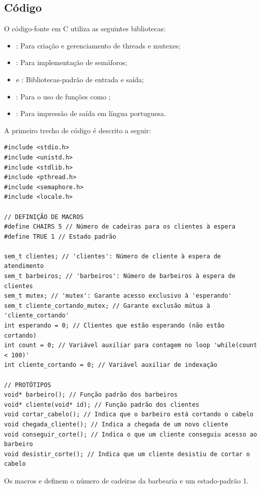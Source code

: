 \documentclass[
	12pt,				%
	openright,			%
	oneside,			%
	a4paper,			%
	chapter=TITLE,		%
	english,			%
	french,				%
	spanish,			%
	brazil				%
	]{abntex2}
\theoremstyle{definition}
\begin{document}
\subsection{Código}
O código-fonte em C utiliza as seguintes bibliotecas:
\begin{itemize}
    \item \textbf{}: Para criação e gerenciamento de threads e mutexes;
    \item \textbf{}: Para implementação de semáforos;
    \item \textbf{} e \textbf{}: Bibliotecas-padrão de entrada e saída;
    \item \textbf{}: Para o uso de funções como ;
    \item \textbf{}: Para impressão de saída em língua portuguesa.
\end{itemize}

A primeiro trecho de código é descrito a seguir:
\begin{verbatim}
#include <stdio.h>
#include <unistd.h>
#include <stdlib.h>
#include <pthread.h>
#include <semaphore.h>
#include <locale.h>

// DEFINIÇÃO DE MACROS
#define CHAIRS 5 // Número de cadeiras para os clientes à espera
#define TRUE 1 // Estado padrão

sem_t clientes; // 'clientes': Número de cliente à espera de atendimento 
sem_t barbeiros; // 'barbeiros': Número de barbeiros à espera de clientes 
sem_t mutex; // 'mutex': Garante acesso exclusivo à 'esperando'
sem_t cliente_cortando_mutex; // Garante exclusão mútua à 'cliente_cortando'
int esperando = 0; // Clientes que estão esperando (não estão cortando) 
int count = 0; // Variável auxiliar para contagem no loop 'while(count < 100)'
int cliente_cortando = 0; // Variável auxiliar de indexação

// PROTÓTIPOS
void* barbeiro(); // Função padrão dos barbeiros
void* cliente(void* id); // Função padrão dos clientes
void cortar_cabelo(); // Indica que o barbeiro está cortando o cabelo
void chegada_cliente(); // Indica a chegada de um novo cliente
void conseguir_corte(); // Indica o que um cliente conseguiu acesso ao barbeiro
void desistir_corte(); // Indica que um cliente desistiu de cortar o cabelo
\end{verbatim}

Os macros  e  definem o número de cadeiras da barbearia e um estado-padrão 1.
\end{document}
